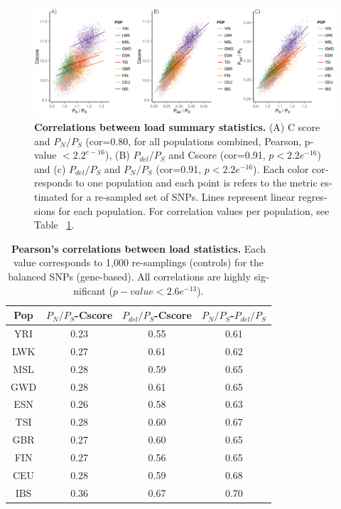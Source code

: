 \begin{refsection}
\begin{otherlanguage}{english}
\begin{figure}
\centering
\includegraphics[]{chap3_folder/figures/scatter_del_controls.png}
\caption{\textbf{Correlations between load summary statistics.} (A) C score and $P_{N}/P_{S}$ (cor=0.80, for all populations combined, Pearson, p-value $< 2.2^{e-16}$), (B) $P_{del}/P_{S}$ and Cscore (cor=0.91, $p< 2.2e^{-16}$) and (c) $P_{del}/P_{S}$ and $P_{N}/P_{S}$ (cor=0.91, $p< 2.2e^{-16}$). Each color corresponds to one population and each point is refers to the metric estimated for a re-sampled set of SNPs. Lines represent linear regressions for each population. For correlation values per population, see Table ~\ref{tab:correlations}.}

\label{fig:scatter}
\end{figure}



\begin{table}[h]
\centering
\begin{tabular}{@{}cccc@{}}
\toprule
\rowcolor[HTML]{C0C0C0} 
{\color[HTML]{000000} Pop} & {\color[HTML]{000000} $P_{N}/P_{S}$-Cscore} & {\color[HTML]{000000} $P_{del}/P_{S}$-Cscore} & {\color[HTML]{000000} $P_{N}/P_{S}$-$P_{del}/P_{S}$} \\ \midrule
YRI & 0.23 & 0.55 & 0.61\\
LWK & 0.27 & 0.61 & 0.62 \\
MSL & 0.28 & 0.59 & 0.65 \\
GWD & 0.28 & 0.61 & 0.65 \\
ESN & 0.26 & 0.58 & 0.63 \\
TSI & 0.28 & 0.60 & 0.67 \\
GBR & 0.27 & 0.60 & 0.65 \\
FIN & 0.27 & 0.56 & 0.65 \\
CEU & 0.28 & 0.59 & 0.68 \\
IBS & 0.36 & 0.67 & 0.70 \\ \bottomrule
\end{tabular}
\caption{\textbf{Pearson's correlations between load statistics.} Each value corresponds to 1,000 re-samplings (controls) for the balanced SNPs (gene-based). All correlations are highly significant ($p-value < 2.6e^{-13}$).
}
\label{tab:correlations}
\end{table}



\end{otherlanguage}
\end{refsection}
